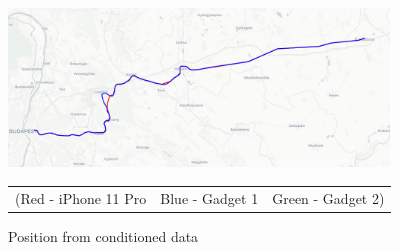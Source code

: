 \documentclass{article}
\begin{document}
			\begin{figure}[h]
				\centering
		   		\includegraphics[width=0.9\textwidth]{cond_map.png}
		   		\caption{Position from conditioned data}
		   		\begin{tabular}{c c c}
					\footnotesize (Red - iPhone 11 Pro & \footnotesize Blue - Gadget 1 & \footnotesize Green - Gadget 2)
		      \end{tabular} 
		      \label{fig:cond_map}
			\end{figure}
\end{document}

